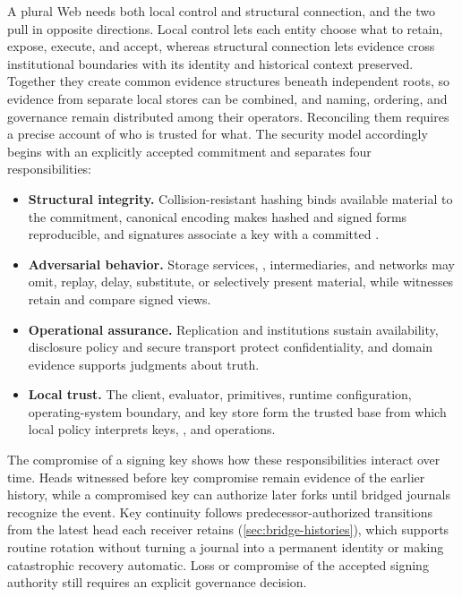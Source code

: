 A plural Web needs both local control and structural connection, and the two pull in opposite directions. Local control lets each entity choose what to retain, expose, execute, and accept, whereas structural connection lets evidence cross institutional boundaries with its identity and historical context preserved. Together they create common evidence structures beneath independent roots, so evidence from separate local stores can be combined, and naming, ordering, and governance remain distributed among their operators. Reconciling them requires a precise account of who is trusted for what. The security model accordingly begins with an explicitly accepted commitment and separates four responsibilities:

\begin{itemize}
  \item \textbf{Structural integrity.} Collision-resistant hashing binds available material to the commitment, canonical encoding makes hashed and signed forms reproducible, and signatures associate a key with a committed .
  \item \textbf{Adversarial behavior.} Storage services, , intermediaries, and networks may omit, replay, delay, substitute, or selectively present material, while witnesses retain and compare signed views.
  \item \textbf{Operational assurance.} Replication and institutions sustain availability, disclosure policy and secure transport protect confidentiality, and domain evidence supports judgments about truth.
  \item \textbf{Local trust.} The client, evaluator,  primitives, runtime configuration, operating-system boundary, and key store form the trusted base from which local policy interprets keys, , and operations.
\end{itemize}

The compromise of a signing key shows how these responsibilities interact over time. Heads witnessed before key compromise remain evidence of the earlier history, while a compromised key can authorize later forks until bridged journals recognize the event. Key continuity follows predecessor-authorized transitions from the latest head each receiver retains (\cref{sec:bridge-histories}), which supports routine rotation without turning a journal into a permanent identity or making catastrophic recovery automatic. Loss or compromise of the accepted signing authority still requires an explicit governance decision.

